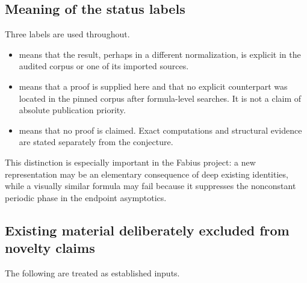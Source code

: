 \documentclass[11pt,oneside]{article}
\theoremstyle{definition}
\begin{document}
\subsection{Meaning of the status labels}

Three labels are used throughout.

\begin{itemize}
\item \baseline means that the result, perhaps in a different normalization,
      is explicit in the audited corpus or one of its imported sources.
\item \newresult means that a proof is supplied here and that no explicit
      counterpart was located in the pinned corpus after formula-level
      searches.  It is not a claim of absolute publication priority.
\item \conjstatus means that no proof is claimed.  Exact computations and
      structural evidence are stated separately from the conjecture.
\end{itemize}

This distinction is especially important in the Fabius project: a new
representation may be an elementary consequence of deep existing identities,
while a visually similar formula may fail because it suppresses the
nonconstant periodic phase in the endpoint asymptotics.

\subsection{Existing material deliberately excluded from novelty claims}

The following are treated as established inputs.
\end{document}
